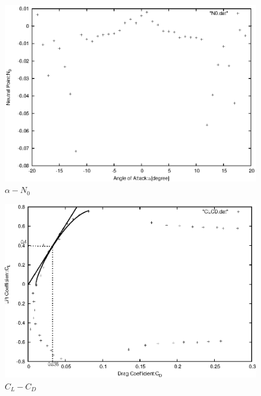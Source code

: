\documentclass[a4j,twoside,openright,11pt]{jarticle}
\begin{document}
\begin{figure}[htbp]
\begin{center}
\includegraphics[width=12cm]{./N0/N0.eps}
\end{center}
\caption{$\alpha - N_0$}
\end{figure}

\begin{figure}[htbp]
\begin{center}
\includegraphics[width=12cm]{./CLCD/CLCD2.eps}
\end{center}
\caption{$C_L - C_D$}
\end{figure}


\newpage
\end{document}
